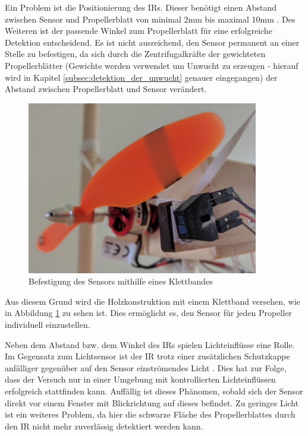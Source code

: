 Ein Problem ist die Positionierung des \ac{IR}s.
Dieser benötigt einen Abstand zwischen Sensor und Propellerblatt von minimal 2mm bis maximal 10mm \cite[Description]{sensor_ir_description}.
Des Weiteren ist der passende Winkel zum Propellerblatt für eine erfolgreiche Detektion entscheidend.
Es ist nicht ausreichend, den Sensor permanent an einer Stelle zu befestigen, da sich durch die Zentrifugalkräfte der gewichteten Propellerblätter (Gewichte werden verwendet um Unwucht zu erzeugen - hierauf wird in Kapitel \ref{subsec:detektion_der_unwucht} genauer eingegangen) der Abstand zwischen Propellerblatt und Sensor verändert.
\begin{figure}[H]
	\centering
	\includegraphics[width=0.9\textwidth]{images/chapter/03/exp_ir_sensor.jpg}
	\caption{Befestigung des Sensors mithilfe eines Klettbandes}
	\label{fig:exp_ir_sensor}
\end{figure}
Aus diesem Grund wird die Holzkonstruktion mit einem Klettband versehen, wie in Abbildung \ref{fig:exp_ir_sensor} zu sehen ist.
Dies ermöglicht es, den Sensor für jeden Propeller individuell einzustellen.

Neben dem Abstand bzw. dem Winkel des \ac{IR}s spielen Lichteinflüsse eine Rolle.
Im Gegensatz zum Lichtsensor ist der \ac{IR} trotz einer zusätzlichen Schutzkappe anfälliger gegenüber auf den Sensor einströmendes Licht \cite[Features]{ir_datasheet}.
Dies hat zur Folge, dass der Versuch nur in einer Umgebung mit kontrollierten Lichteinflüssen erfolgreich stattfinden kann.
Auffällig ist dieses Phänomen, sobald sich der Sensor direkt vor einem Fenster mit Blickrichtung auf dieses befindet.
Zu geringes Licht ist ein weiteres Problem, da hier die schwarze Fläche des Propellerblattes durch den \ac{IR} nicht mehr zuverlässig detektiert werden kann.

